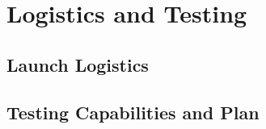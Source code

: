 \section{Logistics and Testing}
\subsection{Launch Logistics}
\subsection{Testing Capabilities and Plan}